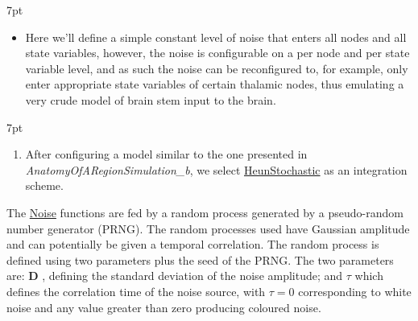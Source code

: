\documentclass{tufte-handout}
\newenvironment{simulation}{%
  \def\FrameCommand{%
    \hspace{1pt}%
    {\color{ForestGreen}\vrule width 2pt}%
    {\color{simulationshade}\vrule width 4pt}%
    \colorbox{simulationshade}%
  }%
  \MakeFramed{\advance\hsize-\width\FrameRestore}%
  \noindent\hspace{-4.55pt}%
  \begin{adjustwidth}{}{7pt}%
  \vspace{2pt}\vspace{2pt}%
}
{%
  \vspace{2pt}\end{adjustwidth}\endMakeFramed%
}
\newenvironment{blah}{%
  \def\FrameCommand{%
    \hspace{1pt}%
    {\color{DarkOrange}\vrule width 2pt}%
    {\color{PeachPuff}\vrule width 4pt}%
    \colorbox{PeachPuff}%
  }%
  \MakeFramed{\advance\hsize-\width\FrameRestore}%
  \noindent\hspace{-4.55pt}%
  \begin{adjustwidth}{}{7pt}%
  \vspace{2pt}\vspace{2pt}%
}
{%
  \vspace{2pt}\end{adjustwidth}\endMakeFramed%
}
\begin{document}
\begin{blah}
\begin{itemize}
\item Here we'll define a simple constant level of noise that enters all
nodes and all state variables, however, the noise is configurable on a per
node and per state variable level, and as such the noise can be reconfigured
to, for example, only enter appropriate state variables of certain thalamic
nodes, thus emulating a very crude model of brain stem input to the brain. 
\end{itemize}
\end{blah}

\begin{simulation}
\begin{enumerate}
\item After configuring a model similar to the one presented in  \textit{AnatomyOfARegionSimulation\_b}, we select \underline{HeunStochastic} as an integration scheme.  
\end{enumerate}
\end{simulation}

The \underline{Noise} functions are fed by a
random process generated by a pseudo-random number generator (PRNG). The random
processes used have Gaussian amplitude and can potentially be given a temporal
correlation. The random process is defined using two
parameters plus the seed of the PRNG. The two parameters are: $\mathbf{D}$ , defining the
standard deviation of the noise amplitude; and ${\tau}$ which defines the
correlation time of the noise source, with $\tau = 0$ corresponding to white
noise and any value greater than zero producing coloured noise. 
\end{document}
